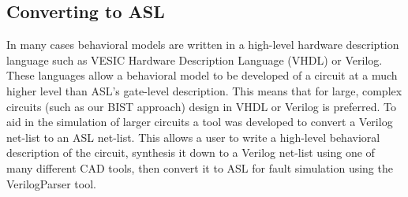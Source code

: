 \documentclass[12pt]{report}
\begin{document}
\subsection{Converting to ASL}
In many cases behavioral models are written in a high-level hardware description language such as VESIC Hardware Description Language (VHDL) or Verilog.  These languages allow a behavioral model to be developed of a circuit at a much higher level than ASL's gate-level description.  This means that for large, complex circuits (such as our BIST approach) design in VHDL or Verilog is preferred.  To aid in the simulation of larger circuits a tool was developed to convert a Verilog net-list to an ASL net-list.  This allows a user to write a high-level behavioral description of the circuit, synthesis it down to a Verilog net-list using one of many different CAD tools, then convert it to ASL for fault simulation using the VerilogParser tool.
\end{document}
